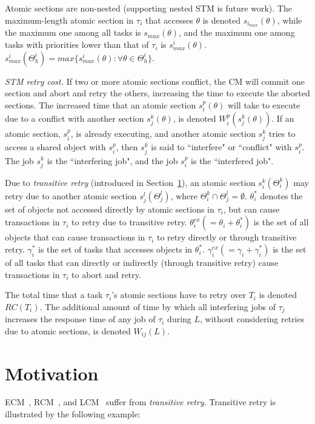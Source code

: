 \documentclass[conference]{IEEEtran}
\begin{document}
Atomic sections are non-nested (supporting nested STM is future work). The maximum-length atomic section in $\tau_i$ that accesses $\theta$ is denoted $s_{i_{max}} (\theta)$, while the maximum one among all tasks is $s_{max} (\theta)$, and the maximum one among tasks with priorities lower than that of $\tau_i$ is $s_{max}^i (\theta)$. $s_{max}^i(\Theta_h^i)=max\{s_{max}^i(\theta):\forall \theta \in \Theta_h^i\}$.

\textit{STM retry cost.} If two or more atomic sections conflict, the CM will commit one section and abort and retry the others, increasing the time to execute the aborted sections. The increased time that an atomic section $s_i^p (\theta)$ will take to execute due to a conflict with another section $s_j^k (\theta)$, is denoted $W_{i}^{p}(s_{j}^{k}(\theta))$. If an atomic section, $s_i^p$, is already executing, and another atomic section $s_j^k$ tries to access a shared object with $s_i^p$, then $s_j^k$ is said to ``interfere" or ``conflict" with $s_i^p$. The job $s_j^k$ is the ``interfering job", and the job $s_i^p$ is the ``interfered job".

Due to \textit{transitive retry} (introduced in Section~\ref{sec:motivation}), an atomic section $s_i^k(\Theta_i^k)$ may retry due to another atomic section $s_j^l(\Theta_j^l)$, where $\Theta_i^k \cap \Theta_j^l = \emptyset$. $\theta_i^*$ denotes the set of objects not accessed directly by atomic sections in $\tau_i$, but can cause transactions in $\tau_i$ to retry due to transitive retry. $\theta_i^{ex}(=\theta_i + \theta_i^*)$ is the set of all objects that can cause transactions in $\tau_i$ to retry directly or through transitive retry. $\gamma_i^*$ is the set of tasks that accesses  objects in $\theta_i^*$. $\gamma_i^{ex}(=\gamma_i + \gamma_i^*)$ is the set of all tasks that can directly or indirectly (through transitive retry) cause transactions in $\tau_i$ to abort and retry.

The total time that a task $\tau_i$'s atomic sections have to retry over $T_i$ is denoted $RC(T_i)$. The additional amount of time by which all interfering jobs of $\tau_j$ increases the response time of any job of $\tau_i$ during $L$, without considering retries due to atomic sections, is denoted $W_{ij}(L)$.

\section{Motivation}
\label{sec:motivation}

ECM~\cite{stmconcurrencycontrol:emsoft11}, RCM~\cite{stmconcurrencycontrol:emsoft11}, and LCM~\cite{lcmdac2012} suffer from \textit{transitive retry}. Transitive retry is illustrated by the following example:
\end{document}
